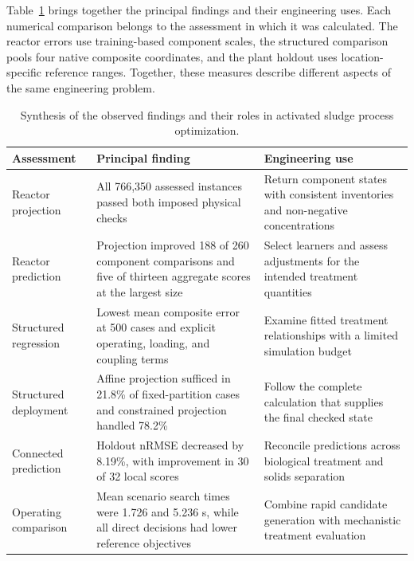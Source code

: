 Table~\ref{tab:integrated_observed_findings} brings together the principal findings and their engineering uses. Each numerical comparison belongs to the assessment in which it was calculated. The reactor errors use training-based component scales, the structured comparison pools four native composite coordinates, and the plant holdout uses location-specific reference ranges. Together, these measures describe different aspects of the same engineering problem.

\begin{table}[htbp]
\centering\small
\caption{Synthesis of the observed findings and their roles in activated sludge process optimization.}
\label{tab:integrated_observed_findings}
\begin{tabular}{>{\raggedright\arraybackslash}p{}>{\raggedright\arraybackslash}p{}>{\raggedright\arraybackslash}p{}}
\toprule
Assessment & Principal finding & Engineering use\\
\midrule
Reactor projection & All 766,350 assessed instances passed both imposed physical checks & Return component states with consistent inventories and non-negative concentrations\\
Reactor prediction & Projection improved 188 of 260 component comparisons and five of thirteen aggregate scores at the largest size & Select learners and assess adjustments for the intended treatment quantities\\
Structured regression & Lowest mean composite error at 500 cases and explicit operating, loading, and coupling terms & Examine fitted treatment relationships with a limited simulation budget\\
Structured deployment & Affine projection sufficed in 21.8\% of fixed-partition cases and constrained projection handled 78.2\% & Follow the complete calculation that supplies the final checked state\\
Connected prediction & Holdout nRMSE decreased by 8.19\%, with improvement in 30 of 32 local scores & Reconcile predictions across biological treatment and solids separation\\
Operating comparison & Mean scenario search times were 1.726 and 5.236 s, while all direct decisions had lower reference objectives & Combine rapid candidate generation with mechanistic treatment evaluation\\
\bottomrule
\end{tabular}
\end{table}

